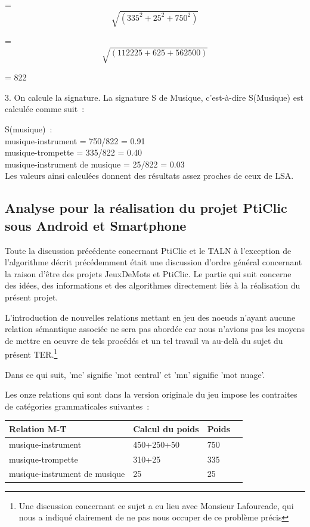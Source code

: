 \documentclass[a4paper,11pt,french]{article}
\begin{document}
= 
\[
\sqrt{(335^2 + 25^2 +750^2)}
\]

 =  
\[ 
\sqrt{(112225 + 625 + 562500)} 
\]

= 822

3. On calcule la signature. La signature S de Musique, c'est-à-dire S(Musique) est calculée comme suit~:

S(musique)~: \\
musique-instrument = 750/822 = 0.91 \\ 
musique-trompette = 335/822 = 0.40 \\
musique-instrument de musique = 25/822 = 0.03 \\

Les valeurs ainsi calculées donnent des résultats assez proches de ceux de LSA.


\subsection{Analyse pour la réalisation du projet PtiClic sous Android et Smartphone}

Toute la discussion précédente concernant PtiClic et le TALN à l'exception de l'algorithme décrit précédemment était une discussion d'ordre général concernant la raison d'être des projets JeuxDeMots et PtiClic. Le partie qui suit concerne des idées, des informations et des algorithmes directement liés à la réalisation du présent projet. 

L'introduction de nouvelles relations mettant en jeu des noeuds n'ayant aucune relation sémantique associée ne sera pas abordée car nous n'avions pas les moyens de mettre en oeuvre de tels procédés et un tel travail va au-delà du sujet du présent TER.\footnote{Une discussion concernant ce sujet a eu lieu avec Monsieur Lafourcade, qui nous a indiqué clairement de ne pas nous occuper de ce problème précis}  

Dans ce qui suit, 'mc' signifie 'mot central' et 'mn' signifie 'mot nuage'.

Les onze relations qui sont dans la version originale du jeu impose les contraites de catégories grammaticales suivantes~:




\begin{center}
        \begin{tabular}{ | l | l | l | p{5cm} |}
        \hline
        Relation M-T & Calcul du poids & Poids \\ \hline
        musique-instrument & 450+250+50 & 750 \\ \hline
        musique-trompette & 310+25 & 335 \\ \hline
        musique-instrument de musique & 25 & 25 \\ \hline
        \end{tabular}
\end{center}
\end{document}
